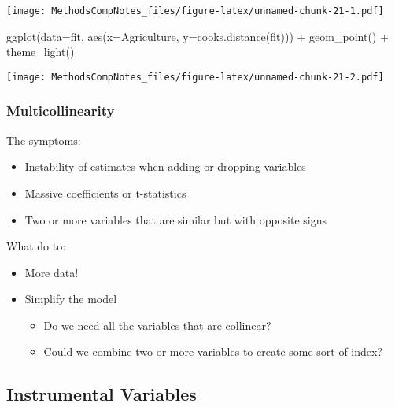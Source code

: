 \documentclass[
]{article}
\newenvironment{Shaded}{\begin{snugshade}}{\end{snugshade}}
\newcommand{\AttributeTok}[1]{\textcolor[rgb]{0.77,0.63,0.00}{#1}}
\newcommand{\FunctionTok}[1]{\textcolor[rgb]{0.00,0.00,0.00}{#1}}
\newcommand{\NormalTok}[1]{#1}
\newcommand{\SpecialCharTok}[1]{\textcolor[rgb]{0.00,0.00,0.00}{#1}}
\begin{document}
\texttt{[image: MethodsCompNotes\_files/figure-latex/unnamed-chunk-21-1.pdf]}

\begin{Shaded}
\begin{Highlighting}[]
\FunctionTok{ggplot}\NormalTok{(}\AttributeTok{data=}\NormalTok{fit, }\FunctionTok{aes}\NormalTok{(}\AttributeTok{x=}\NormalTok{Agriculture, }\AttributeTok{y=}\FunctionTok{cooks.distance}\NormalTok{(fit))) }\SpecialCharTok{+}
  \FunctionTok{geom\_point}\NormalTok{() }\SpecialCharTok{+}
  \FunctionTok{theme\_light}\NormalTok{()}
\end{Highlighting}
\end{Shaded}

\texttt{[image: MethodsCompNotes\_files/figure-latex/unnamed-chunk-21-2.pdf]}

\hypertarget{multicollinearity}{%
\subsubsection{Multicollinearity}\label{multicollinearity}}

The symptoms:

\begin{itemize}
\item
  Instability of estimates when adding or dropping variables
\item
  Massive coefficients or t-statistics
\item
  Two or more variables that are similar but with opposite signs
\end{itemize}

What do to:

\begin{itemize}
\item
  More data!
\item
  Simplify the model

  \begin{itemize}
  \item
    Do we need all the variables that are collinear?
  \item
    Could we combine two or more variables to create some sort of index?
  \end{itemize}
\end{itemize}

\hypertarget{instrumental-variables}{%
\subsection{Instrumental Variables}\label{instrumental-variables}}
\end{document}

